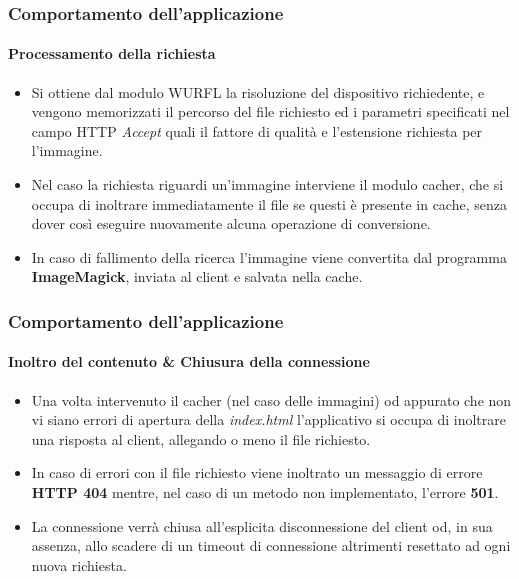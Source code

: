 \documentclass{beamer}
\begin{document}
\begin{frame}
\frametitle{Comportamento dell'applicazione}
\framesubtitle{Processamento della richiesta}

\begin{itemize}

\item Si ottiene dal modulo WURFL la risoluzione del
dispositivo richiedente, e vengono memorizzati il percorso del file richiesto
ed i parametri specificati nel campo HTTP \textit{Accept} quali il fattore di qualità e
l’estensione richiesta per l’immagine.

\item Nel caso la richiesta riguardi un’immagine interviene il modulo cacher, che si
occupa di inoltrare immediatamente il file se questi è presente in cache, senza
dover così eseguire nuovamente alcuna operazione di conversione.

\item In caso di
fallimento
della
ricerca
l’immagine
viene
convertita
dal
programma
\textbf{ImageMagick}, inviata al client e salvata nella cache.
\end{itemize}
\end{frame}



\begin{frame}
\frametitle{Comportamento dell'applicazione}
\framesubtitle{Inoltro del contenuto \& Chiusura della connessione}
\begin{itemize}
\item Una volta intervenuto il cacher (nel caso delle immagini) od appurato che non vi
siano errori di apertura della \textit{index.html} l’applicativo si occupa di inoltrare una
risposta al client, allegando o meno il file richiesto.

\item In caso di errori con il file
richiesto viene inoltrato un messaggio di errore \textbf{HTTP 404} mentre, nel caso di un
metodo non implementato, l’errore \textbf{501}.

\item La connessione verrà chiusa all’esplicita disconnessione del client od, in sua
assenza, allo scadere di un timeout di connessione altrimenti resettato ad ogni
nuova richiesta.
\end{itemize}
\end{frame}
\end{document}

